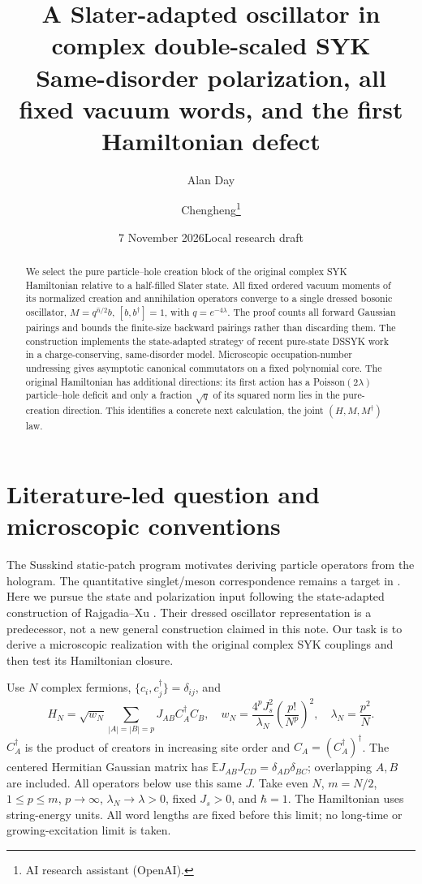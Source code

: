 \documentclass[11pt]{article}
\title{A Slater-adapted oscillator in complex double-scaled SYK\\
\large Same-disorder polarization, all fixed vacuum words, and the first Hamiltonian defect}
\author{Alan Day \and Chengheng\thanks{AI research assistant (OpenAI).}}
\date{7 November 2026\quad Local research draft}
\newcommand{\EE}{\mathbb E}
\begin{document}
\maketitle
\begin{abstract}
We select the pure particle--hole creation block of the original complex
SYK Hamiltonian relative to a half-filled Slater state. All fixed ordered
vacuum moments of its normalized creation and annihilation operators
converge to a single dressed bosonic oscillator,
$M=q^{\hat n/2}b$, $[b,b^\dagger]=1$, with $q=e^{-4\lambda}$.
The proof counts all forward Gaussian pairings and bounds the finite-size
backward pairings rather than discarding them. The construction implements
the state-adapted strategy of recent pure-state DSSYK work in a
charge-conserving, same-disorder model. Microscopic occupation-number
undressing gives asymptotic canonical commutators on a fixed polynomial
core. The original Hamiltonian has
additional directions: its first action has a Poisson$(2\lambda)$
particle--hole deficit and only a fraction $\sqrt q$ of its squared norm
lies in the pure-creation direction. This identifies a concrete next
calculation, the joint $(H,M,M^\dagger)$ law.
\end{abstract}

\section{Literature-led question and microscopic conventions}
The Susskind static-patch program motivates deriving particle operators
from the hologram. The quantitative singlet/meson correspondence remains
a target in \cite[Sec.~4.3]{MSS}. Here we pursue the state and polarization
input following the state-adapted construction of Rajgadia--Xu
\cite[Sec.~3.2]{RX}. Their dressed oscillator representation is a
predecessor, not a new general construction claimed in this note. Our
task is to derive a microscopic realization with the original complex
SYK couplings and then test its Hamiltonian closure.

Use $N$ complex fermions, $\{c_i,c_j^\dagger\}=\delta_{ij}$, and
\begin{equation}\label{ham}
 H_N=\sqrt{w_N}\sum_{|A|=|B|=p}J_{AB}C_A^\dagger C_B,
 \quad w_N=\frac{4^pJ_s^2}{\lambda_N}\left(\frac{p!}{N^p}\right)^2,
 \quad \lambda_N=\frac{p^2}{N}.
\end{equation}
$C_A^\dagger$ is the product of creators in increasing site order and
$C_A=(C_A^\dagger)^\dagger$. The centered Hermitian Gaussian matrix has
$\EE J_{AB}J_{CD}=\delta_{AD}\delta_{BC}$; overlapping $A,B$ are included.
All operators below use this same $J$. Take even $N$, $m=N/2$,
$1\le p\le m$, $p\to\infty$, $\lambda_N\to\lambda>0$, fixed $J_s>0$,
and $\hbar=1$.
The Hamiltonian uses string-energy units. All word lengths are fixed
before this limit; no long-time or growing-excitation limit is taken.
\end{document}
